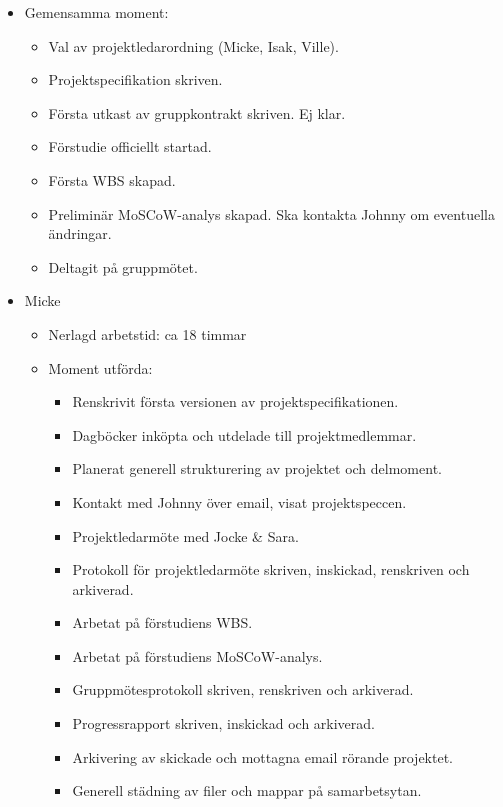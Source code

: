 \begin{itemize}[noitemsep]
    \item Gemensamma moment:
    \begin{itemize}[noitemsep]
        \item Val av projektledarordning (Micke, Isak, Ville).
        \item Projektspecifikation skriven.
        \item Första utkast av gruppkontrakt skriven. Ej klar.
        \item Förstudie officiellt startad.
        \item Första WBS skapad.
        \item Preliminär MoSCoW-analys skapad. Ska kontakta Johnny om eventuella ändringar.
        \item Deltagit på gruppmötet.
    \end{itemize}
    \item Micke
    \begin{itemize}[noitemsep]
        \item Nerlagd arbetstid: ca 18 timmar
        \item Moment utförda:
        \begin{itemize}[noitemsep]
            \item Renskrivit första versionen av projektspecifikationen.
            \item Dagböcker inköpta och utdelade till projektmedlemmar.
            \item Planerat generell strukturering av projektet och delmoment.
            \item Kontakt med Johnny över email, visat projektspeccen.
            \item Projektledarmöte med Jocke \& Sara.
            \item Protokoll för projektledarmöte skriven, inskickad, renskriven och arkiverad.
            \item Arbetat på förstudiens WBS.
            \item Arbetat på förstudiens MoSCoW-analys.
            \item Gruppmötesprotokoll skriven, renskriven och arkiverad.
            \item Progressrapport skriven, inskickad och arkiverad.
            \item Arkivering av skickade och mottagna email rörande projektet.
            \item Generell städning av filer och mappar på samarbetsytan.
        \end{itemize}

\end{itemize}
\end{itemize}
